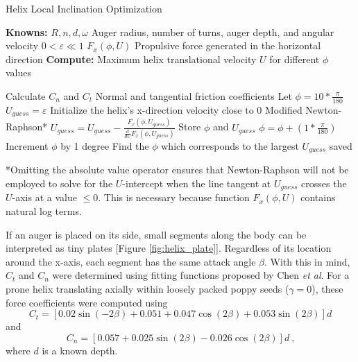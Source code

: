 \documentclass[letterpaper, 11 pt]{article}
\begin{document}
\begin{algorithm}[H]
	\caption{Helix Local Inclination Optimization}
	\label{augerOpt}
	
	\begin{algorithmic} %
	\State \textbf{Knowns:}
	\State $R, n, d, \omega$ \Comment Auger radius, number of turns, auger depth, and angular velocity
	\State $0<\varepsilon \ll 1$
	\State $F_x(\phi,U)$ \Comment Propulsive force generated in the horizontal direction
	\State
	\State \textbf{Compute:} Maximum helix translational velocity $U$ for different $\phi$ values
	\end{algorithmic}
	
	\begin{algorithmic}[1] %
	\State Calculate $C_n$ and $C_t$ \Comment Normal and tangential friction coefficients 
	\State Let $\phi = 10*\frac{\pi}{180}$
		\State $U_{guess} = \varepsilon$ \Comment Initialize the helix's x-direction velocity close to 0 
		 \Comment Modified Newton-Raphson*
			\State $U_{guess} = U_{guess} - \frac{F_x(\phi, U_{guess})}{\frac{d}{dU}F_x(\phi,U_{guess})}$
		\EndWhile
		\State Store $\phi$ and $U_{guess}$ 
		\State $\phi = \phi + (1*\frac{\pi}{180})$ \Comment Increment $\phi$ by 1 degree
	\EndWhile
	\State Find the $\phi$ which corresponds to the largest $U_{guess}$ saved
	\end{algorithmic}
\end{algorithm}
*Omitting the absolute value operator ensures that Newton-Raphson will not be employed to solve for the $U$-intercept when the line tangent at $U_{guess}$ crosses the $U$-axis at a value $\leq 0$. This is necessary because function $F_x(\phi,U)$ contains natural log terms.   

\medskip
If an auger is placed on its side, small segments along the body can be interpreted as tiny plates [Figure \ref{fig:helix_plate}]. Regardless of its location around the x-axis, each segment has the same attack angle $\beta$. With this in mind, $C_t$ and $C_n$ were determined using fitting functions proposed by Chen \textit{et al}. For a prone helix translating axially within loosely packed poppy seeds ($\gamma = 0$), these force coefficients were computed using 
\begin{equation}\label{chenCt}
C_t = \left[0.02\sin(-2\beta)+0.051+0.047\cos(2\beta)+0.053\sin(2\beta) \right]d
\end{equation}
and
\begin{equation}\label{chenCn}
C_n = \left[0.057+0.025\sin(2\beta)-0.026\cos(2\beta) \right]d\ \text{,}
\end{equation}
where $d$ is a known depth. 
\end{document}
